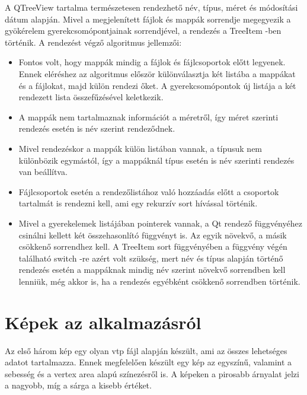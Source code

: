 
\vspace{3mm}

A {\ttfamily QTreeView} tartalma természetesen rendezhető név, típus, méret 
és módosítási dátum alapján. 
Mivel a megjelenített fájlok és mappák sorrendje megegyezik 
a gyökérelem gyerekcsomópontjainak sorrendjével, 
a rendezés a {\ttfamily TreeItem} -ben történik. 
\newline
A rendezést végző algoritmus jellemzői:
\begin{itemize}
\item
Fontos volt, hogy mappák mindig a fájlok és fájlcsoportok előtt legyenek. 
Ennek eléréshez az algoritmus először különválasztja két listába 
a mappákat és a fájlokat, majd külön rendezi őket. 
A gyerekcsomópontok új listája a két rendezett lista összefűzésével keletkezik. 
\item
A mappák nem tartalmaznak információt a méretről, 
így méret szerinti rendezés esetén is név szerint rendeződnek. 
\item
Mivel rendezéskor a mappák külön listában vannak, 
a típusuk nem különbözik egymástól, 
így a mappáknál típus esetén is név szerinti rendezés van beállítva.
\item
Fájlcsoportok esetén a rendezőlistához való hozzáadás előtt 
a csoportok tartalmát is rendezni kell, 
ami egy rekurzív {\ttfamily sort} hívással történik.
\item
Mivel a gyerekelemek listájában pointerek vannak, 
a Qt rendező függvényéhez csinálni kellett két összehasonlító függvényt is. 
Az egyik növekvő, a másik csökkenő sorrendhez kell. 
A {\ttfamily TreeItem} {\ttfamily sort}
függvényében a függvény végén 
található switch -re azért volt szükség, 
mert név és típus alapján történő rendezés esetén 
a mappáknak mindig név szerint növekvő sorrendben kell lenniük,
még akkor is, ha a rendezés egyébként csökkenő sorrendben történik.
\end{itemize}

\section{Képek az alkalmazásról}

Az első három kép
egy olyan vtp fájl alapján készült, 
ami az összes lehetséges adatot tartalmazza.
Ennek megfelelően készült egy kép az egyszínű,
valamint a sebesség és a vertex area alapú színezésről is.
A képeken a pirosabb árnyalat jelzi a nagyobb, 
míg a sárga a kisebb értéket.

